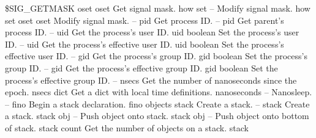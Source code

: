 \begin{longtable}{}
\hline
\optableent
	{\$SIG\_GETMASK oset}
	{{\bf {}}}
	{oset}
	{Get signal mask.}
\optableent
	{how set}
	{{\bf {}}}
	{--}
	{Modify signal mask.}
\optableent
	{how set oset}
	{{\bf {}}}
	{oset}
	{Modify signal mask.}
\hline
\optableent
	{--}
	{{\bf {}}}
	{pid}
	{Get process ID.}
\hline
\optableent
	{--}
	{{\bf {}}}
	{pid}
	{Get parent's process ID.}
\hline
\optableent
	{--}
	{{\bf {}}}
	{uid}
	{Get the process's user ID.}
\hline
\optableent
	{uid}
	{{\bf {}}}
	{boolean}
	{Set the process's user ID.}
\hline
\optableent
	{--}
	{{\bf {}}}
	{uid}
	{Get the process's effective user ID.}
\hline
\optableent
	{uid}
	{{\bf {}}}
	{boolean}
	{Set the process's effective user ID.}
\hline
\optableent
	{--}
	{{\bf {}}}
	{gid}
	{Get the process's group ID.}
\hline
\optableent
	{gid}
	{{\bf {}}}
	{boolean}
	{Set the process's group ID.}
\hline
\optableent
	{--}
	{{\bf {}}}
	{gid}
	{Get the process's effective group ID.}
\hline
\optableent
	{gid}
	{{\bf {}}}
	{boolean}
	{Set the process's effective group ID.}
\hline
\optableent
	{--}
	{{\bf {}}}
	{nsecs}
	{Get the number of nanoseconds since the epoch.}
\hline
\optableent
	{nsecs}
	{{\bf {}}}
	{dict}
	{Get a dict with local time definitions.}
\hline
\optableent
	{nanoseconds}
	{{\bf {}}}
	{--}
	{Nanosleep.}
\hline \hline
{} \\
\hline \hline
\optableent
	{--}
	{{\bf {}}}
	{fino}
	{Begin a stack declaration.}
\hline
\optableent
	{fino objects}
	{{\bf {}}}
	{stack}
	{Create a stack.}
\hline
\optableent
	{--}
	{{\bf {}}}
	{stack}
	{Create a stack.}
\hline
\optableent
	{stack obj}
	{{\bf {}}}
	{--}
	{Push object onto stack.}
\hline
\optableent
	{stack obj}
	{{\bf {}}}
	{--}
	{Push object onto bottom of stack.}
\hline
\optableent
	{stack}
	{{\bf {}}}
	{count}
	{Get the number of objects on a stack.}
\hline
\optableent
	{stack}
	{{\bf {}}}

\end{longtable}
